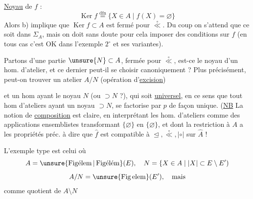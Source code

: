 \uline{Noyau} de $f$ :
\[
\operatorname{Ker} f\overset{\mathrm{dfn}}{=}\{X\in A\mid f(X)=\varnothing\}
\]
Alors b) implique que $\operatorname{Ker} f\subset A$ est fermé pour $\overset{\circ}{\ll}$. Du coup on s'attend que ce soit dans $\Sigma_A$, mais on doit sans doute pour cela imposer des conditions  sur $f$ (en tous cas c'est OK dans l'exemple $2^\circ$ et ses variantes).

Partons d'une partie $\unsure{N}\subset A$, fermée pour $\overset{\circ}{\ll}$, est-ce le noyau d'un hom. d'atelier, et ce dernier peut-il se choisir canoniquement ? Plus précisément, peut-on trouver un atelier $A/N$ (opération d'\uline{excision})


et un hom
ayant le noyau $N$ (ou $\supset N$ ?), qui soit \uline{universel}, en ce sens que tout hom d'ateliers
ayant un noyau $\supset N$, se factorise par $p$ de façon unique. (\uline{NB} La notion de \uline{composition} est claire, en interprétant les hom. d'ateliers comme des applications ensemblistes
transformant $\{\varnothing\}$ en $\{\varnothing\}$, et   dont la restriction à $A$ a les propriétés préc.  à dire que $\widehat{f}$ est compatible à $\trianglelefteq,\overset{\circ}{\ll},\mathrel{|\circ|}$ sur $\widehat{A}$ !

L'exemple type est celui où
\[
A=\unsure{\operatorname{Fig\acute{e}lem}|\operatorname{Fig\acute{e}l\acute{e}m}}(E),\quad N=\{X\in A\mid |X|\subset E\setminus E')
\]
\[
A/N=\unsure{\operatorname{Fig\,elem}}(E'),\quad\text{mais}
\]
    comme quotient de $A\setminus N$

